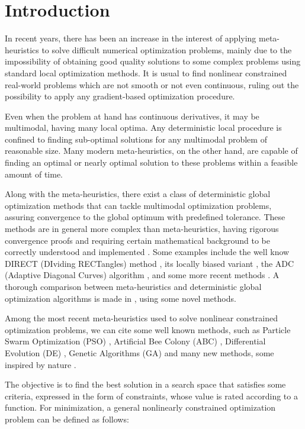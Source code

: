 \section{Introduction} \label{sec:Introduction}

In recent years, there has been an increase in the interest of applying meta-heuristics to solve difficult numerical optimization problems, mainly due to the impossibility of obtaining good quality solutions to some complex problems using standard local optimization methods. It is usual to find nonlinear constrained real-world problems which are not smooth or not even continuous, ruling out the possibility to apply any gradient-based optimization procedure.

Even when the problem at hand has continuous derivatives, it may be multimodal, having many local optima. Any deterministic local procedure is confined to finding sub-optimal solutions for any multimodal problem of reasonable size. Many modern meta-heuristics, on the other hand, are capable of finding an optimal or nearly optimal solution to these problems within a feasible amount of time.

Along with the meta-heuristics, there exist a class of deterministic global optimization methods that can tackle multimodal optimization problems, assuring convergence to the global optimum with predefined tolerance. These methods are in general more complex than meta-heuristics, having rigorous convergence proofs and requiring certain mathematical background to be correctly understood and implemented \citep{BOOKS1, BOOKS2, NAT}. Some examples include the well know DIRECT (DIviding RECTangles) method \citep{DIRECT}, its locally biased variant \citep{DIRECTL}, the ADC (Adaptive Diagonal Curves) algorithm \citep{ADC}, and some more recent methods \cite{ADC2, GEO, SIMP}. A thorough comparison between meta-heuristics and deterministic global optimization algorithms is made in \cite{NAT}, using some novel methods.

Among the most recent meta-heuristics used to solve nonlinear constrained optimization problems, we can cite some well known methods, such as Particle Swarm Optimization (PSO) \citep{IPSO, IAPSO, PSO1}, Artificial Bee Colony (ABC) \citep{CB-ABC, IABC-Mal}, Differential Evolution (DE) \citep{DE1, DE2, MVDE}, Genetic Algorithms (GA) \citep{GA1} and many new methods, some inspired by nature \citep{CS, WCA, MBA}.

The objective is to find the best solution in a search space that satisfies some criteria, expressed in the form of constraints, whose value is rated according to a function. For minimization, a general nonlinearly constrained optimization problem can be defined as follows: \\[-3em]

